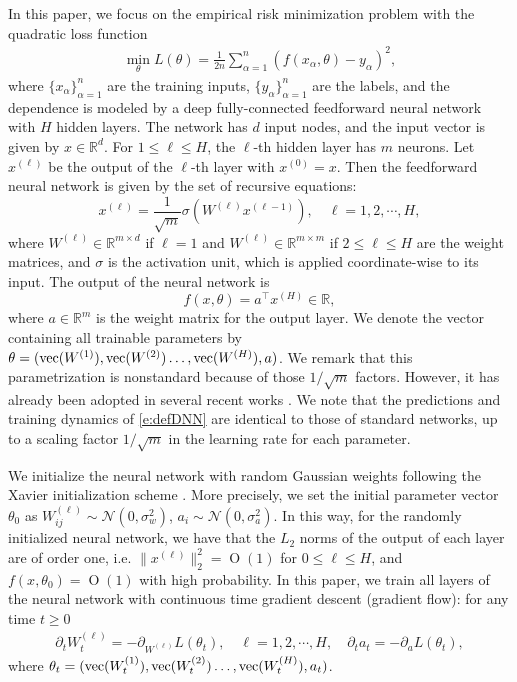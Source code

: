 \documentclass{article}
\numberwithin{equation}{section}
\newcommand{\bR}{{\mathbb R}}
\newcommand{\al}{\alpha}
\DeclareMathOperator{\OO}{O}
\renewcommand{\leq}{\leqslant}
\renewcommand{\geq}{\geqslant}
\newcommand{\cob}{\color{darkblue}}
\newcommand{\nc}{\normalcolor}
\newcommand{\del}{\partial}
\newcommand{\1}{\mathds{1}}
\theoremstyle{plain} %
\begin{document}
In this paper, we focus on the empirical risk minimization problem with the quadratic loss function
\begin{align*}
\min_\theta L(\theta)=\frac{1}{2n}\sum_{\al=1}^n (f(x_\al,\theta)-y_\al)^2,
\end{align*}
where $\{x_\al\}_{\al=1}^n$ are the training inputs, $\{y_\al\}_{\al=1}^n$ are the labels, and the dependence is modeled by a deep fully-connected feedforward neural network with $H$ hidden layers. 
The network has $d$ input nodes, and the input vector is given by $x\in {\mathbb R}^{d}$. For $1\leq \ell\leq H$, the  $\ell$-th hidden layer has $m$ neurons. Let $x^{(\ell)}$ be the output of the $\ell$-th layer with $x^{(0)}=x$. Then the feedforward neural network is given by the set of recursive equations:
\begin{equation}\label{e:defDNN}
x^{(\ell)}=\frac{1}{\sqrt{m}}\sigma(W^{(\ell)}x^{(\ell-1)}),\quad \ell=1,2,\cdots, H,
\end{equation}
where $W^{(\ell)}\in \bR^{m \times d}$ if $\ell=1$ and $W^{(\ell)}\in \bR^{m\times m}$ if $2\leq \ell\leq H$ are the weight matrices, and $\sigma$ is the activation unit, which is applied coordinate-wise to its input.  The output of the neural network is 
\begin{equation}\label{eq:f}
f(x,\theta)=a^\top x^{(H)} \in {\mathbb R}, 
\end{equation}
where $a\in \bR^{m}$ is the weight matrix for the output layer. 
We denote the vector containing all trainable parameters by $\theta=({\rm vec}(W^{(1)}), {\rm vec}(W^{(2)})\dots, {\rm vec}(W^{(H)}),a)$. We remark that this parametrization is nonstandard because of those $1/\sqrt m$ factors. However, it has already been adopted in several recent works \cite{jacot2018neural, du2018gradient1,du2018gradient2,lee2019wide}. We note that the predictions and training dynamics of \eqref{e:defDNN} are identical to those of standard networks, up to a scaling factor $1/\sqrt m$ in the learning rate for each parameter. 


We initialize the neural network with random Gaussian weights following the Xavier initialization scheme \cite{glorot2010understanding}. More precisely, we set the initial parameter vector $\theta_0$  as $W^{(\ell)}_{ij} \sim \mathcal N(0, \sigma^2_w)$, $a_i\sim \mathcal N(0,\sigma_a^2)$. In this way, for the randomly initialized neural network, we have that the $L_2$ norms of the output of each layer are of order one, i.e. $\|x^{(\ell)}\|_2^2=\OO(1)$ %
for $0\leq \ell\leq H$, and $f(x,\theta_0)=\OO(1)$ with high probability. In this paper, we train all layers of the neural network with continuous time gradient descent (gradient flow): for  any  time $t\geq 0$ 
\begin{align}\label{e:gd}
\del_t W^{(\ell)}_t=- \del_{W^{(\ell)}}L(\theta_t),\quad \ell=1,2,\cdots, H, \quad \del_t a_t=- \del_{a}L(\theta_t),
\end{align}
where 
$\theta_t=({\rm vec}(W_t^{(1)}), {\rm vec}(W^{(2)}_t)\dots, {\rm vec}(W^{(H)}_t),a_t)$.
\end{document}
